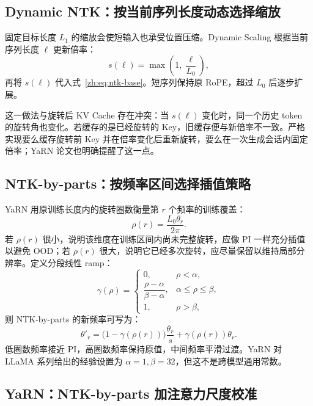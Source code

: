 \documentclass[UTF8,fontset=none,a4paper,10pt]{ctexart}
\begin{document}
\subsection{Dynamic NTK：按当前序列长度动态选择缩放}

固定目标长度 $L_1$ 的缩放会使短输入也承受位置压缩。Dynamic Scaling 根据当前序列长度 $\ell$ 更新倍率\cite{zh:peng2024yarn}：
\begin{equation}
  s(\ell)=\max\left(1,\frac{\ell}{L_0}\right),
  \label{zh:eq:dynamic-scale}
\end{equation}
再将 $s(\ell)$ 代入式~\eqref{zh:eq:ntk-base}。短序列保持原 RoPE，超过 $L_0$ 后逐步扩展。

这一做法与旋转后 KV Cache 存在冲突：当 $s(\ell)$ 变化时，同一个历史 token 的旋转角也变化。若缓存的是已经旋转的 Key，旧缓存便与新倍率不一致。严格实现要么缓存旋转前 Key 并在倍率变化后重新旋转，要么在一次生成会话内固定倍率；YaRN 论文也明确提醒了这一点\cite{zh:peng2024yarn}。

\subsection{NTK-by-parts：按频率区间选择插值策略}

YaRN 用原训练长度内的旋转圈数衡量第 $r$ 个频率的训练覆盖：
\begin{equation}
  \rho(r)=\frac{L_0\theta_r}{2\pi}.
  \label{zh:eq:rotation-count}
\end{equation}
若 $\rho(r)$ 很小，说明该维度在训练区间内尚未完整旋转，应像 PI 一样充分插值以避免 OOD；若 $\rho(r)$ 很大，说明它已经多次旋转，应尽量保留以维持局部分辨率。定义分段线性 ramp：
\begin{equation}
  \gamma(\rho)=
  \begin{cases}
    0,&\rho<\alpha,\\
    \dfrac{\rho-\alpha}{\beta-\alpha},&\alpha\le\rho\le\beta,\\
    1,&\rho>\beta,
  \end{cases}
  \label{zh:eq:ramp}
\end{equation}
则 NTK-by-parts 的新频率可写为：
\begin{equation}
  \theta'_r=
  \bigl(1-\gamma(\rho(r))\bigr)\frac{\theta_r}{s}
  +\gamma(\rho(r))\theta_r.
  \label{zh:eq:ntk-by-parts}
\end{equation}
低圈数频率接近 PI，高圈数频率保持原值，中间频率平滑过渡。YaRN 对 LLaMA 系列给出的经验设置为 $\alpha=1,\beta=32$，但这不是跨模型通用常数\cite{zh:peng2024yarn}。

\subsection{YaRN：NTK-by-parts 加注意力尺度校准}
\end{document}
